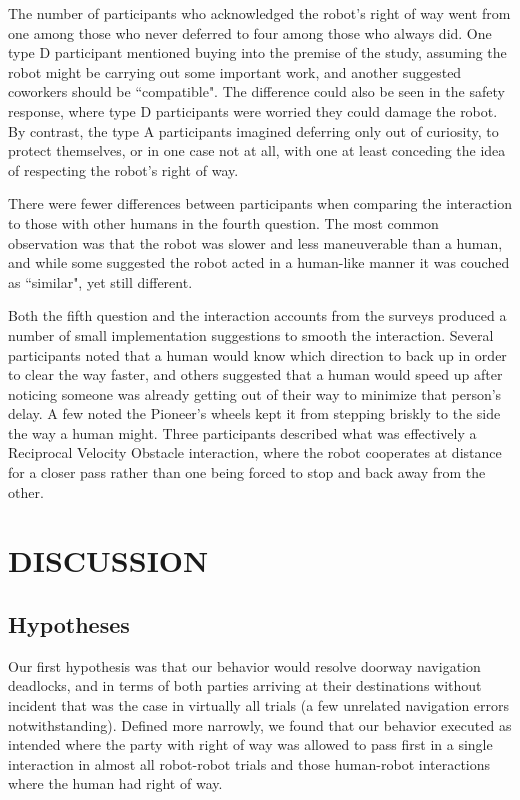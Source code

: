 \documentclass[letterpaper, 10 pt, conference]{ieeeconf}  %
\begin{document}
The number of participants who acknowledged the robot's right of way went from one among those who never deferred to four among those who always did. One type D participant mentioned buying into the premise of the study, assuming the robot might be carrying out some important work, and another suggested coworkers should be ``compatible". The difference could also be seen in the safety response, where type D participants were worried they could damage the robot. By contrast, the type A participants imagined deferring only out of curiosity, to protect themselves, or in one case not at all, with one at least conceding the idea of respecting the robot's right of way.

There were fewer differences between participants when comparing the interaction to those with other humans in the fourth question. The most common observation was that the robot was slower and less maneuverable than a human, and while some suggested the robot acted in a human-like manner it was couched as ``similar", yet still different.

Both the fifth question and the interaction accounts from the surveys produced a number of small implementation suggestions to smooth the interaction. Several participants noted that a human would know which direction to back up in order to clear the way faster, and others suggested that a human would speed up after noticing someone was already getting out of their way to minimize that person's delay. A few noted the Pioneer's wheels kept it from stepping briskly to the side the way a human might. Three participants described what was effectively a Reciprocal Velocity Obstacle interaction, where the robot cooperates at distance for a closer pass rather than one being forced to stop and back away from the other. 

\section{DISCUSSION}

\subsection{Hypotheses}

Our first hypothesis was that our behavior would resolve doorway navigation deadlocks, and in terms of both parties arriving at their destinations without incident that was the case in virtually all trials (a few unrelated navigation errors notwithstanding). Defined more narrowly, we found that our behavior executed as intended where the party with right of way was allowed to pass first in a single interaction in almost all robot-robot trials and those human-robot interactions where the human had right of way. 
\end{document}
